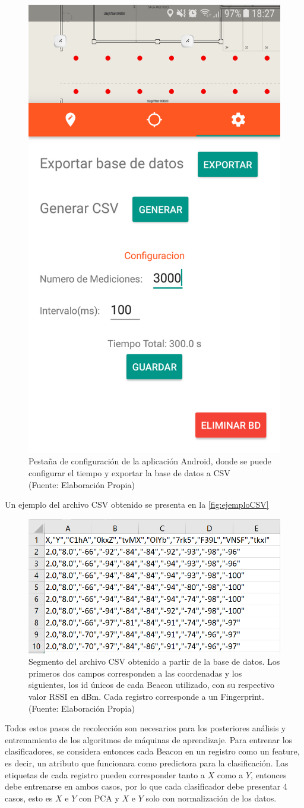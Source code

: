 \begin{figure}[ht!]
\centering
\includegraphics[width=.3\textwidth]{figures/configApp.png}
\caption[Pestaña de configuración de la aplicación Android]{Pestaña de configuración de la aplicación Android, donde se puede configurar el tiempo y exportar la base de datos a CSV\\
{\scriptsize (Fuente: Elaboración Propia)}}
\label{fig:configApp}
\end{figure}


Un ejemplo del archivo CSV obtenido se presenta en la \autoref{fig:ejemploCSV}


\begin{figure}[ht!]
\centering
\includegraphics[width=.6\textwidth]{figures/ejemplo_csv.png}
\caption[Archivo CSV obtenido a partir de base de datos]{Segmento del archivo CSV obtenido a partir de la base de datos. Los primeros dos campos corresponden a las coordenadas y los siguientes, los id únicos de cada Beacon utilizado, con su respectivo valor RSSI en dBm. Cada registro corresponde a un Fingerprint. \\
{\scriptsize (Fuente: Elaboración Propia)}}
\label{fig:ejemploCSV}
\end{figure}

Todos estos pasos de recolección son necesarios para los posteriores análisis y entrenamiento de los algoritmos de máquinas de aprendizaje. Para entrenar los clasificadores, se considera entonces cada Beacon en un registro como un feature, es decir, un atributo que funcionara como predictora para la clasificación. Las etiquetas de cada registro pueden corresponder tanto a $X$ como a $Y$, entonces debe entrenarse en ambos casos, por lo que cada clasificador debe presentar 4 casos, esto es $X$ e $Y$ con PCA y $X$ e $Y$ solo con normalización de los datos.

